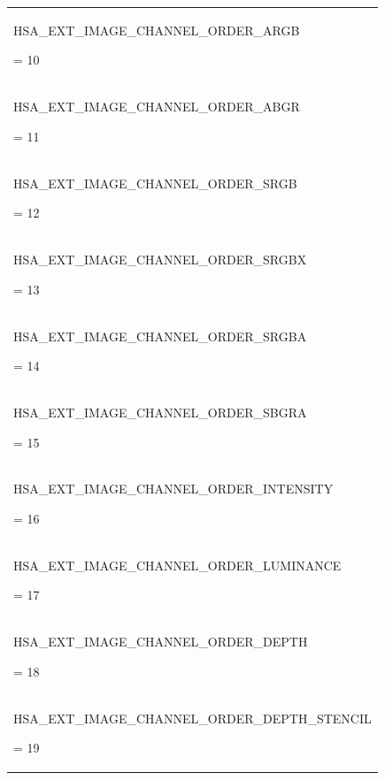 \documentclass[final]{book}
\newcommand{\reftyp}[1]{#1}
\newcommand{\refenu}[1]{\reftyp{#1}}
\begin{document}
\begin{longtable}{@{\hspace{2em}}p{\linewidth-2em}}
\hspace{-2em}\hypertarget{group__images_1ggabaced4fb1f3b9fdaa978e143af5ff055a7a49085ae07e467293c0a10d003a2356}{\refenu{HSA_EXT_IMAGE_CHANNEL_ORDER_ARGB}} = 10\\[2mm]
\hspace{-2em}\hypertarget{group__images_1ggabaced4fb1f3b9fdaa978e143af5ff055a8fd833428ebe3e1428e0001115ec6880}{\refenu{HSA_EXT_IMAGE_CHANNEL_ORDER_ABGR}} = 11\\[2mm]
\hspace{-2em}\hypertarget{group__images_1ggabaced4fb1f3b9fdaa978e143af5ff055a64dbb297ed7cf48f525ffe32aa653319}{\refenu{HSA_EXT_IMAGE_CHANNEL_ORDER_SRGB}} = 12\\[2mm]
\hspace{-2em}\hypertarget{group__images_1ggabaced4fb1f3b9fdaa978e143af5ff055a38d8f1c70900f6646df6a6d20746f840}{\refenu{HSA_EXT_IMAGE_CHANNEL_ORDER_SRGBX}} = 13\\[2mm]
\hspace{-2em}\hypertarget{group__images_1ggabaced4fb1f3b9fdaa978e143af5ff055ae9980a3013f42e7d56f4fd28ea8c3b7c}{\refenu{HSA_EXT_IMAGE_CHANNEL_ORDER_SRGBA}} = 14\\[2mm]
\hspace{-2em}\hypertarget{group__images_1ggabaced4fb1f3b9fdaa978e143af5ff055a2617e3d26bbf6dd3c136534dcf5e4594}{\refenu{HSA_EXT_IMAGE_CHANNEL_ORDER_SBGRA}} = 15\\[2mm]
\hspace{-2em}\hypertarget{group__images_1ggabaced4fb1f3b9fdaa978e143af5ff055a5fb131f53f229f55456287a009da9b6e}{\refenu{HSA_EXT_IMAGE_CHANNEL_ORDER_INTENSITY}} = 16\\[2mm]
\hspace{-2em}\hypertarget{group__images_1ggabaced4fb1f3b9fdaa978e143af5ff055a5576d6ae7fd07c21fa8196c4323f1476}{\refenu{HSA_EXT_IMAGE_CHANNEL_ORDER_LUMINANCE}} = 17\\[2mm]
\hspace{-2em}\hypertarget{group__images_1ggabaced4fb1f3b9fdaa978e143af5ff055ad26aef84eb00f1d1e9defc45f7508e50}{\refenu{HSA_EXT_IMAGE_CHANNEL_ORDER_DEPTH}} = 18\\[2mm]
\hspace{-2em}\hypertarget{group__images_1ggabaced4fb1f3b9fdaa978e143af5ff055aa1c158a53efa2619ceefa748f3d99a99}{\refenu{HSA_EXT_IMAGE_CHANNEL_ORDER_DEPTH_STENCIL}} = 19
\end{longtable}
\end{document}
